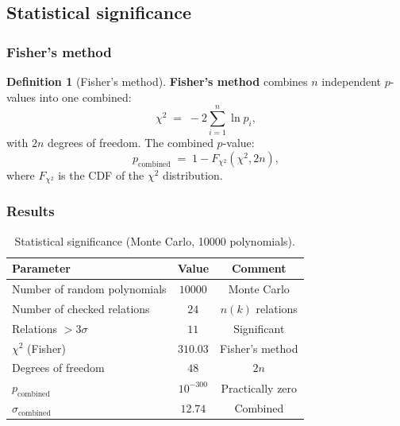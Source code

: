 \documentclass[11pt,a4paper]{article}
\theoremstyle{definition}
\newtheorem{definition}[theorem]{Definition}
\begin{document}
\subsection{Statistical significance}
\label{subsec:cv-statistical}

\subsubsection{Fisher's method}

\begin{definition}[Fisher's method]
\label{def:fisher}
\textbf{Fisher's method} combines $n$ independent $p$-values
into one combined:
\begin{equation}
    \chi^2 \;=\; -2 \sum_{i=1}^{n} \ln p_i,
    \label{eq:fisher-chi2}
\end{equation}
with $2n$ degrees of freedom. The combined $p$-value:
\begin{equation}
    p_{\text{combined}} \;=\; 1 - F_{\chi^2}(\chi^2, 2n),
\end{equation}
where $F_{\chi^2}$ is the CDF of the $\chi^2$ distribution.
\end{definition}

\subsubsection{Results}

\begin{table}[ht]
\centering
\caption{Statistical significance (Monte Carlo, 10000 polynomials).}
\label{tab:statistical-main}
\begin{tabular}{lcc}
\toprule
Parameter & Value & Comment \\
\midrule
Number of random polynomials & $10000$ & Monte Carlo \\
Number of checked relations  & $24$ & $n(k)$ relations \\
Relations $> 3\sigma$        & $11$ & Significant \\
$\chi^2$ (Fisher)         & $310.03$ & Fisher's method \\
Degrees of freedom           & $48$ & $2n$ \\
$p_{\text{combined}}$     & $10^{-300}$ & Practically zero \\
$\sigma_{\text{combined}}$ & $\mathbf{12.74}$ & Combined \\
\bottomrule
\end{tabular}
\end{table}
\end{document}
